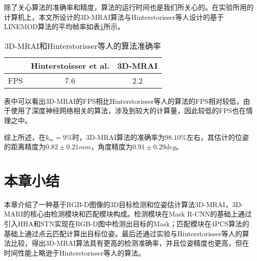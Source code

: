 除了关心算法的准确率和精度，算法的运行时间也是我们所关心的。在实验所用的计算机上，本文所设计的3D-MRAI算法与Hinterstorisser等人设计的基于LINEMOD算法的平均帧率如表\ref{tab:mrai-fps}所示。
\begin{table}[ht]
  \centering
  \begin{tabular}{ccc}
    \toprule
    &Hinterstoisser et al.&\bf{3D-MRAI}\\
    \midrule
    FPS&7.6&2.2\\
    \bottomrule
  \end{tabular}
  \caption{3D-MRAI和Hinterstorisser等人的算法准确率}
  \label{tab:mrai-fps}
\end{table}
表中可以看出3D-MRAI的FPS相比Hinterstorisser等人的算法的FPS相对较低，由于使用了深度神经网络相关的算法，涉及到较大的计算量，因此较低的FPS也在情理之中。

综上所述，在$k_m=9\%$时，3D-MRAI算法的准确率为$98.10\%$左右，其估计的位姿的距离精度为$0.82\pm0.21mm$，角度精度为$0.91\pm0.29deg$。

\section{本章小结}
本章介绍了一种基于RGB-D图像的3D目标检测和位姿估计算法3D-MRAI，3D-MARI的核心由检测模块和匹配模块构成。检测模块在Mask R-CNN的基础上通过引入HHA和STN实现在RGB-D图中检测出目标的Mask；匹配模块在4PCS算法的基础上通过点云匹配计算出目标位姿。最后还通过实验与Hinterstorisser等人的算法比较，得出3D-MRAI算法具有更高的检测准确率，并且位姿精度也更高，但在时间性能上略逊于Hinterstorisser等人的算法。

